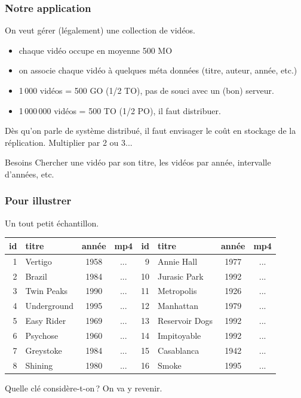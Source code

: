 \begin{frame}
\frametitle{Notre application}

On veut gérer (légalement) une collection de vidéos.

\begin{itemize}
  \item chaque vidéo occupe en moyenne 500 MO
  \item on associe chaque vidéo à quelques méta données (titre, auteur, année, etc.)
  \item 1\,000 vidéos = 500 GO (1/2 TO), pas de souci avec un (bon) serveur.
  \item 1\,000\,000 vidéos = 500 TO (1/2 PO), il faut distribuer.
\end{itemize}

\begin{remark}
Dès qu'on parle de système distribué, il faut envisager le coût en stockage de la réplication. Multiplier
par 2 ou 3...
\end{remark}


\begin{noteblock}{Besoins}
Chercher une vidéo par son titre, les vidéos par année, intervalle d'années, etc.
\end{noteblock}

\end{frame}


\begin{frame}
\frametitle{Pour illustrer}

Un tout petit échantillon.

\begin{center}
\begin{small}
\begin{tabular}{r|l|c|c||r|l|c|c}
id &titre & année  & mp4  & id & titre & année  & mp4  \\
\hline
1 & Vertigo  & 1958 & ... & 9 & Annie Hall & 1977 & ... \\
2 & Brazil & 1984 & ... & 10&Jurasic Park & 1992 & ... \\
3&Twin Peaks & 1990 & ...&  11&Metropolis & 1926 & ... \\
4&Underground & 1995 & ... & 12&Manhattan & 1979 & ... \\
5&Easy Rider & 1969 & ... & 13&Reservoir Dogs & 1992 & ... \\
6&Psychose & 1960 & ... & 14&Impitoyable & 1992 & ... \\
7&Greystoke & 1984 & ... & 15&Casablanca & 1942 & ... \\
8&Shining & 1980 & ... & 16&Smoke & 1995 & ... \\
\hline
\end{tabular}
\end{small}
\end{center}

Quelle clé considère-t-on\,? On va y revenir.

\end{frame}

